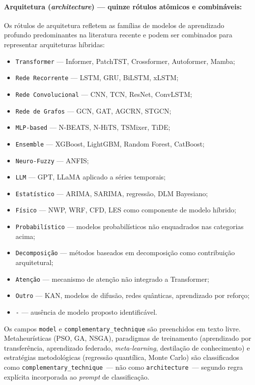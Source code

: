 \paragraph{Arquitetura (\textit{architecture}) — quinze rótulos
atômicos e combináveis:}

Os rótulos de arquitetura refletem as famílias de modelos de
aprendizado profundo predominantes na literatura recente e podem
ser combinados para representar arquiteturas híbridas:

\begin{itemize}
  \item \texttt{Transformer} — Informer, PatchTST, Crossformer,
        Autoformer, Mamba;
  \item \texttt{Rede Recorrente} — LSTM, GRU, BiLSTM, xLSTM;
  \item \texttt{Rede Convolucional} — CNN, TCN, ResNet, ConvLSTM;
  \item \texttt{Rede de Grafos} — GCN, GAT, AGCRN, STGCN;
  \item \texttt{MLP-based} — N-BEATS, N-HiTS, TSMixer, TiDE;
  \item \texttt{Ensemble} — XGBoost, LightGBM, Random Forest,
        CatBoost;
  \item \texttt{Neuro-Fuzzy} — ANFIS;
  \item \texttt{LLM} — GPT, LLaMA aplicado a séries temporais;
  \item \texttt{Estatístico} — ARIMA, SARIMA, regressão, DLM
        Bayesiano;
  \item \texttt{Físico} — NWP, WRF, CFD, LES como componente de
        modelo híbrido;
  \item \texttt{Probabilístico} — modelos probabilísticos não
        enquadrados nas categorias acima;
  \item \texttt{Decomposição} — métodos baseados em decomposição
        como contribuição arquitetural;
  \item \texttt{Atenção} — mecanismo de atenção não integrado a
        Transformer;
  \item \texttt{Outro} — KAN, modelos de difusão, redes quânticas,
        aprendizado por reforço;
  \item \texttt{-} — ausência de modelo proposto identificável.
\end{itemize}

Os campos \texttt{model} e \texttt{complementary\_technique} são
preenchidos em texto livre. Metaheurísticas (PSO, GA, NSGA),
paradigmas de treinamento (aprendizado por transferência, aprendizado
federado, \textit{meta-learning}, destilação de conhecimento) e
estratégias metodológicas (regressão quantílica, Monte Carlo) são
classificados como \texttt{complementary\_technique}~--- não como
\texttt{architecture}~--- segundo regra explícita incorporada ao
\textit{prompt} de classificação.


